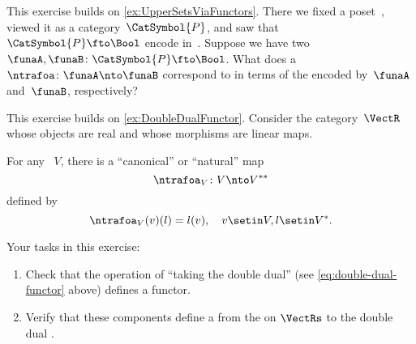 
\begin{gradedexercise}
    \label{ex:UpperSetsNatTrafos}
    This exercise builds on \cref{ex:UpperSetsViaFunctors}.
    There we fixed a poset~\posA, viewed it as a category~$\CatSymbol{P}$, and saw that ~$\CatSymbol{P} \fto \Bool$ encode  in~\posA.
    Suppose we have two ~$\funaA, \funaB \colon \CatSymbol{P} \fto \Bool$.
    What does a ~$\ntrafoa \colon \funaA \nto \funaB$ correspond to in terms of the  encoded by~$\funaA$ and~$\funaB$, respectively?
\end{gradedexercise}


\begin{gradedexercise}
    \label{ex:DoubleDualNatTrafo}
    This exercise builds on \cref{ex:DoubleDualFunctor}.
    Consider the category~$\VectR$ whose objects are real  and whose morphisms are linear maps.

    For any ~$V$, there is a ``canonical'' or ``natural'' map
    \begin{equation}
        \ntrafoa_V \colon V \nto V^{**}
    \end{equation}
    defined by
    \begin{equation}
        \ntrafoa_V(v)(l) = l(v), \quad v \setin V, l \setin V^*.
    \end{equation}

    Your tasks in this exercise:
    \begin{enumerate}
        \item Check that the operation of ``taking the double dual'' (see \cref{eq:double-dual-functor} above) defines a functor.
        \item Verify that these components define a  from the  on $\VectRs$ to the double dual .
    \end{enumerate}
\end{gradedexercise}



